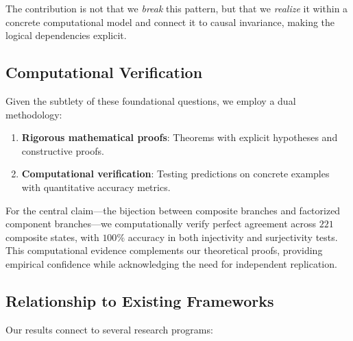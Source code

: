 \documentclass[11pt,a4paper]{article}
\theoremstyle{definition}
\theoremstyle{remark}
\begin{document}
The contribution is not that we \textit{break} this pattern, but that we
\textit{realize} it within a concrete computational model and connect it
to causal invariance, making the logical dependencies explicit.

\subsection{Computational Verification}

Given the subtlety of these foundational questions, we employ a dual
methodology:

\begin{enumerate}
\item \textbf{Rigorous mathematical proofs}: Theorems with explicit
  hypotheses and constructive proofs.
\item \textbf{Computational verification}: Testing predictions on
  concrete examples with quantitative accuracy metrics.
\end{enumerate}

For the central claim---the bijection between composite branches and
factorized component branches---we computationally verify perfect
agreement across $221$ composite states, with $100\%$ accuracy in both
injectivity and surjectivity tests. This computational evidence
complements our theoretical proofs, providing empirical confidence while
acknowledging the need for independent replication.

\subsection{Relationship to Existing Frameworks}

Our results connect to several research programs:
\end{document}
